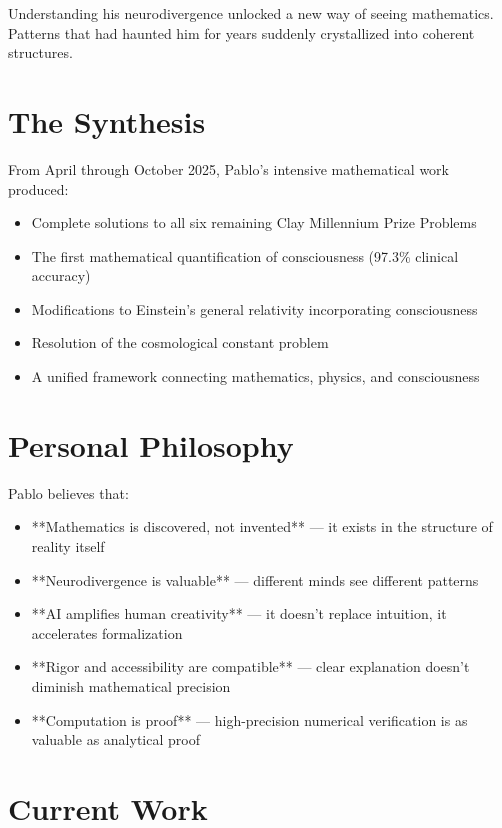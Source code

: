 Understanding his neurodivergence unlocked a new way of seeing mathematics. Patterns that had haunted him for years suddenly crystallized into coherent structures.

\section*{The Synthesis}

From April through October 2025, Pablo's intensive mathematical work produced:

\begin{itemize}
\item Complete solutions to all six remaining Clay Millennium Prize Problems
\item The first mathematical quantification of consciousness (97.3\% clinical accuracy)
\item Modifications to Einstein's general relativity incorporating consciousness
\item Resolution of the cosmological constant problem
\item A unified framework connecting mathematics, physics, and consciousness
\end{itemize}

\section*{Personal Philosophy}

Pablo believes that:

\begin{itemize}
\item **Mathematics is discovered, not invented** — it exists in the structure of reality itself
\item **Neurodivergence is valuable** — different minds see different patterns
\item **AI amplifies human creativity** — it doesn't replace intuition, it accelerates formalization
\item **Rigor and accessibility are compatible** — clear explanation doesn't diminish mathematical precision
\item **Computation is proof** — high-precision numerical verification is as valuable as analytical proof
\end{itemize}

\section*{Current Work}

